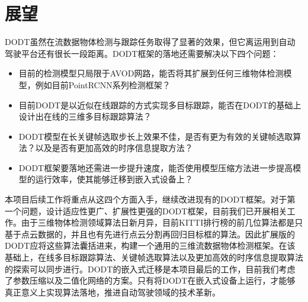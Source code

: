 \section{展望}
\label{future}
DODT虽然在流数据物体检测与跟踪任务取得了显著的效果，但它离运用到自动驾驶平台还有很长一段距离。DODT框架的落地还需要解决以下四个问题：
\begin{itemize}
\item 目前的检测模型只局限于AVOD网路，能否将其扩展到任何三维物体检测模型，例如目前PointRCNN系列检测框架？
\item 目前DODT是以近似在线跟踪的方式实现多目标跟踪，能否在DODT的基础上设计出在线的三维多目标跟踪算法？
\item DODT模型在长关键帧选取步长上效果不佳，是否有更为有效的关键帧选取算法？以及是否有更加高效的时序信息提取方法？
\item DODT框架要落地还需进一步提升速度，能否使用模型压缩方法进一步提高模型的运行效率，使其能够迁移到嵌入式设备上？
\end{itemize}
本项目后续工作将重点从这四个方面入手，继续改进现有的DODT框架。对于第一个问题，设计适应性更广、扩展性更强的DODT框架，目前我们已开展相关工作。由于三维物体检测领域算法日新月异，目前KITTI排行榜的前几位算法都是只基于点云数据的，并且也有先进行点云分割再回归目标框的算法。因此扩展版的DODT应将这些算法囊括进来，构建一个通用的三维流数据物体检测框架。在该基础上，在线多目标跟踪算法、关键帧选取算法以及更加高效的时序信息提取算法的探索可以同步进行。DODT的嵌入式迁移是本项目最后的工作，目前我们考虑了参数压缩以及二值化网络的方案。只有将DODT在嵌入式设备上运行，才能够真正意义上实现算法落地，推进自动驾驶领域的技术革新。

\ifprint
	\newpage
	\thispagestyle{empty}
	\mbox{}
	
	\clearpage
	\setcounter{page}{10}
\fi